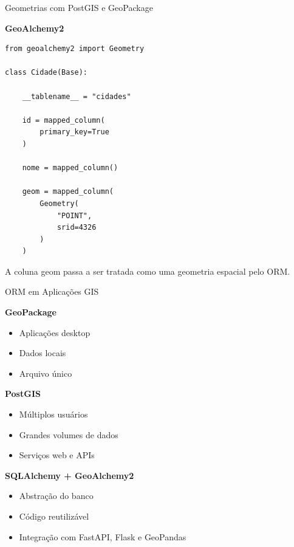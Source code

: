 \documentclass{beamer}
\begin{document}
\begin{frame}[fragile]{Geometrias com PostGIS e GeoPackage}

\textbf{GeoAlchemy2}

\begin{verbatim}
from geoalchemy2 import Geometry

class Cidade(Base):

    __tablename__ = "cidades"

    id = mapped_column(
        primary_key=True
    )

    nome = mapped_column()

    geom = mapped_column(
        Geometry(
            "POINT",
            srid=4326
        )
    )
\end{verbatim}

\vspace{0.3cm}

A coluna geom passa a ser tratada como uma geometria espacial pelo ORM.

\end{frame}

\begin{frame}{ORM em Aplicações GIS}

\textbf{GeoPackage}

\begin{itemize}
    \item Aplicações desktop
    \item Dados locais
    \item Arquivo único
\end{itemize}

\vspace{0.3cm}

\textbf{PostGIS}

\begin{itemize}
    \item Múltiplos usuários
    \item Grandes volumes de dados
    \item Serviços web e APIs
\end{itemize}

\vspace{0.4cm}

\textbf{SQLAlchemy + GeoAlchemy2}

\begin{itemize}
    \item Abstração do banco
    \item Código reutilizável
    \item Integração com FastAPI, Flask e GeoPandas
\end{itemize}

\end{frame}
\end{document}
